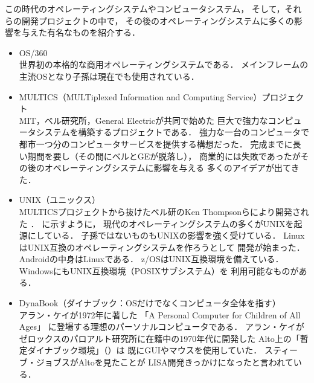 この時代のオペレーティングシステムやコンピュータシステム，
そして，それらの開発プロジェクトの中で，
その後のオペレーティングシステムに多くの影響を与えた有名なものを紹介する．

\begin{itemize}
\item OS/360 \\
世界初の本格的な商用オペレーティングシステムである．
メインフレームの主流OSとなり子孫は現在でも使用されている\cite{os360}．

\item MULTICS（MULTiplexed Information and Computing Service）プロジェクト
\cite{third} \\
MIT，ベル研究所，General Electricが共同で始めた
巨大で強力なコンピュータシステムを構築するプロジェクトである．
強力な一台のコンピュータで
都市一つ分のコンピュータサービスを提供する構想だった．
完成までに長い期間を要し（その間にベルとGEが脱落し），
商業的には失敗であったがその後のオペレーティングシステムに影響を与える
多くのアイデアが出てきた．

\item UNIX（ユニックス） \\
MULTICSプロジェクトから抜けたベル研のKen Thompsonらにより開発された
\cite{unix}．
に示すように，
現代のオペレーティングシステムの多くがUNIXを起源にしている．
子孫ではないものもUNIXの影響を強く受けている．
LinuxはUNIX互換のオペレーティングシステムを作ろうとして
開発が始まった\cite{linux}．
Androidの中身はLinuxである\cite{android}．
z/OSはUNIX互換環境を備えている\cite{zos}．
WindowsにもUNIX互換環境（POSIXサブシステム）を
利用可能なものがある\cite{windows}．

\item DynaBook（ダイナブック：OSだけでなくコンピュータ全体を指す）
\cite{dynabook2} \\
アラン・ケイが1972年に著した
「A Personal Computer for Children of All Ages」\cite{key72, key72J}
に登場する理想のパーソナルコンピュータである．
アラン・ケイがゼロックスのパロアルト研究所に在籍中の1970年代に開発した
Alto上の「暫定ダイナブック環境」（）は
既にGUIやマウスを使用していた．
スティーブ・ジョブスがAltoを見たことが
LISA開発きっかけになったと言われている\cite{dynabook}．


\end{itemize}
